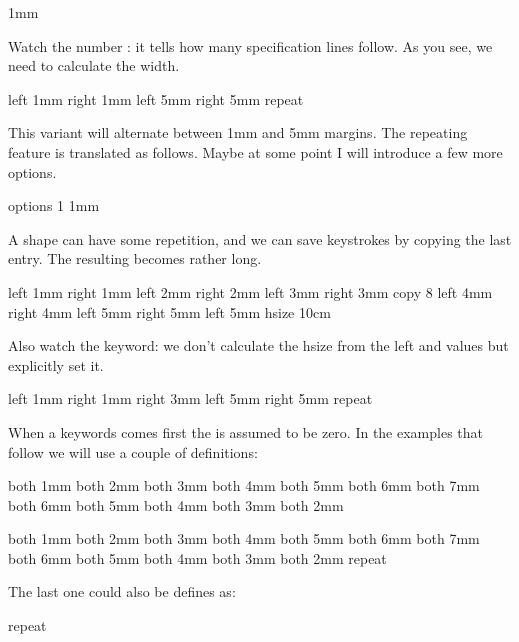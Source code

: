 \starttyping[option=TEX]
    1mm \dimexpr\hsize-1mm\relax
    5mm \dimexpr\hsize-5mm\relax
\stoptyping

Watch the number : it tells how many specification lines follow. As you
see, we need to calculate the width.

\starttyping[option=TEX]
\startparagraphshape[test]
    left 1mm right 1mm
    left 5mm right 5mm
    repeat
\stopparagraphshape
\stoptyping

This variant will alternate between 1mm and 5mm margins. The repeating feature is
translated as follows. Maybe at some point I will introduce a few more options.

\starttyping[option=TEX]
 options 1
    1mm \dimexpr\hsize-1mm\relax
    5mm \dimexpr\hsize-5mm\relax
\stoptyping

A shape can have some repetition, and we can save keystrokes by copying the last
entry. The resulting \type {\parshape} becomes rather long.

\starttyping[option=TEX]
\startparagraphshape[test]
    left 1mm right 1mm
    left 2mm right 2mm
    left 3mm right 3mm
    copy 8
    left 4mm right 4mm
    left 5mm right 5mm
    left 5mm hsize 10cm
\stopparagraphshape
\stoptyping

Also watch the  keyword: we don't calculate the hsize from the \type
{left} and  values but explicitly set it.

\starttyping[option=TEX]
\startparagraphshape[test]
    left 1mm right 1mm
    right 3mm
    left 5mm right 5mm
    repeat
\stopparagraphshape
\stoptyping

When a  keywords comes first the  is assumed to be zero.
In the examples that follow we will use a couple of definitions:

\startbuffer[setup-0]
\startparagraphshape[test]
    both 1mm both 2mm both 3mm both 4mm both 5mm both 6mm
    both 7mm both 6mm both 5mm both 4mm both 3mm both 2mm
\stopparagraphshape
\stopbuffer

    both 1mm both 2mm both 3mm both 4mm both 5mm both 6mm
    both 7mm both 6mm both 5mm both 4mm both 3mm both 2mm
    repeat
\stopparagraphshape
\stopbuffer


The last one could also be defines as:

\starttyping[option=TEX]
     repeat
\stopparagraphshape
\stoptyping

